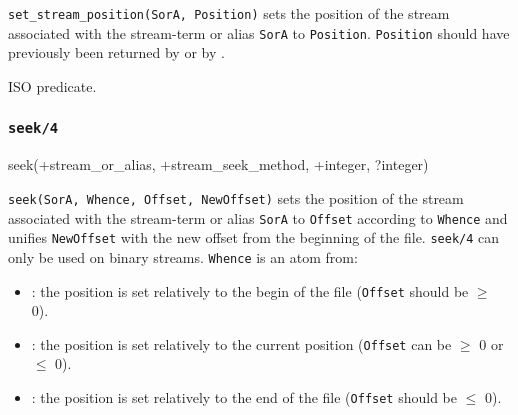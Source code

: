 \Description

\texttt{set\_stream\_position(SorA, Position)} sets the position of
the stream associated with the stream-term or alias \texttt{SorA} to
\texttt{Position}. \texttt{Position} should have previously been returned by
  or by
 .

\begin{PlErrors}







\end{PlErrors}

\Portability

ISO predicate.

\subsubsection{\texttt{seek/4}}

\begin{TemplatesOneCol}
seek(+stream\_or\_alias, +stream\_seek\_method, +integer, ?integer)

\end{TemplatesOneCol}

\Description

\texttt{seek(SorA, Whence, Offset, NewOffset)} sets the position of
the stream associated with the stream-term or alias \texttt{SorA} to
\texttt{Offset} according to \texttt{Whence} and unifies \texttt{NewOffset}
with the new offset from the beginning of the file. \texttt{seek/4} can only
be used on binary streams. \texttt{Whence} is an atom from:

\begin{itemize}

\item {}: the position is set relatively to the begin of the file
(\texttt{Offset} should be $\geq$ 0).

\item {}: the position is set relatively to the current
position (\texttt{Offset} can be $\geq$ 0 or $\leq$ 0).

\item {}: the position is set relatively to the end of the file
(\texttt{Offset} should be $\leq$ 0).

\end{itemize}

